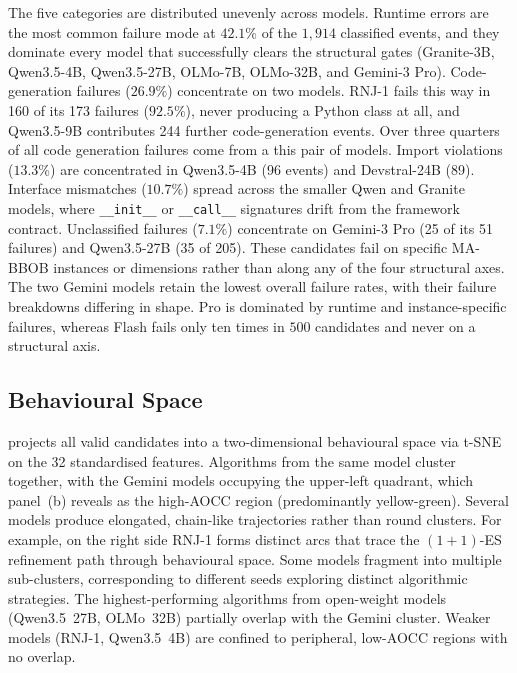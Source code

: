 The five categories are distributed unevenly across models. Runtime errors are the most common failure mode at $42.1\%$ of the $1{,}914$ classified events, and they dominate every model that successfully clears the structural gates (Granite-3B, Qwen3.5-4B, Qwen3.5-27B, OLMo-7B, OLMo-32B, and Gemini-3 Pro). Code-generation failures ($26.9\%$) concentrate on two models. RNJ-1 fails this way in 160 of its 173 failures ($92.5\%$), never producing a Python class at all, and Qwen3.5-9B contributes 244 further code-generation events. Over three quarters of all code generation failures come from a this pair of models. Import violations ($13.3\%$) are concentrated in Qwen3.5-4B (96 events) and Devstral-24B (89). Interface mismatches ($10.7\%$) spread across the smaller Qwen and Granite models, where \texttt{\_\_init\_\_} or \texttt{\_\_call\_\_} signatures drift from the framework contract. Unclassified failures ($7.1\%$) concentrate on Gemini-3 Pro (25 of its 51 failures) and Qwen3.5-27B (35 of 205). These candidates fail on specific MA-BBOB instances or dimensions rather than along any of the four structural axes. The two Gemini models retain the lowest overall failure rates, with their failure breakdowns differing in shape. Pro is dominated by runtime and instance-specific failures, whereas Flash fails only ten times in $500$ candidates and never on a structural axis.


\subsection{Behavioural Space}
\label{sec:results-behavioural-space}


 projects all valid candidates into a two-dimensional behavioural space via t-SNE on the 32 standardised features. Algorithms from the same model cluster together, with the Gemini models occupying the upper-left quadrant, which panel~(b) reveals as the high-AOCC region (predominantly yellow-green). Several models produce elongated, chain-like trajectories rather than round clusters. For example, on the right side RNJ-1 forms distinct arcs that trace the $(1+1)$-ES refinement path through behavioural space. Some models fragment into multiple sub-clusters, corresponding to different seeds exploring distinct algorithmic strategies. The highest-performing algorithms from open-weight models (Qwen3.5~27B, OLMo~32B) partially overlap with the Gemini cluster. Weaker models (RNJ-1, Qwen3.5~4B) are confined to peripheral, low-AOCC regions with no overlap.

